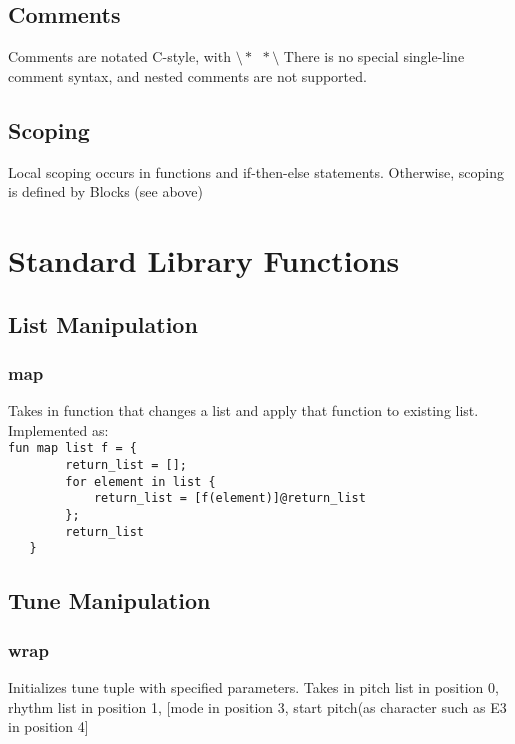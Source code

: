 \documentclass[12pt]{report}
\begin{document}
\section{Comments}
Comments are notated C-style, with $\setminus \ast \ \ \ast \setminus$ There is no special single-line comment syntax, and nested comments are not supported.


\section{Scoping}
Local scoping occurs in functions and if-then-else statements.
Otherwise, scoping is defined by Blocks (see above)


\chapter{Standard Library Functions}


\section{List Manipulation}

\subsection{map}

Takes in function that changes a list and apply that function to existing list.  Implemented as: \\

\texttt{fun map list f = \{\\
\-\ \ \ \ \ \ \ \ return\_list = []; \\
\-\ \ \ \ \ \ \ \ for element in list \{\\
\-\ \ \ \ \ \ \ \ \ \ \ \  return\_list = [f(element)]@return\_list\\
\-\ \ \ \ \ \ \ \ 	\};\\
\-\ \ \ \ \ \ \ \ 	return\_list\\
\-\ \ \ \}}

\section{Tune Manipulation}			




\subsection{wrap}
 Initializes tune tuple with specified parameters. Takes in pitch list in position 0, rhythm list in position 1, [mode in position 3, start pitch(as character such as E3 in position 4]
\end{document}
